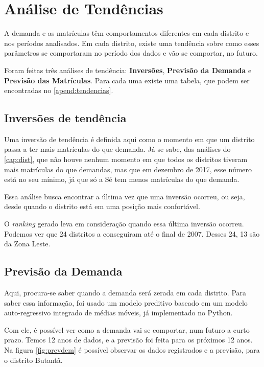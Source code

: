 \chapter{Análise de Tendências}
\label{cap:tendencias}

A demanda e as matrículas têm comportamentos diferentes em cada distrito e nos períodos analisados. Em cada distrito, existe uma tendência sobre como esses parâmetros se comportaram no período dos dados e vão se comportar, no futuro.

Foram feitas três análises de tendência: \textbf{Inversões}, \textbf{Previsão da Demanda} e \textbf{Previsão das Matrículas}. Para cada uma existe uma tabela, que podem ser encontradas no \autoref{apend:tendencias}.

\section{Inversões de tendência}

Uma inversão de tendência é definida aqui como o momento em que um distrito passa a ter mais matrículas do que demanda. Já se sabe, das análises do \autoref{cap:dist}, que não houve nenhum momento em que todos os distritos tiveram mais matrículas do que demandas, mas que em dezembro de 2017, esse número está no seu mínimo, já que só a Sé tem menos matrículas do que demanda.

Essa análise busca encontrar a última vez que uma inversão ocorreu, ou seja, desde quando o distrito está em uma posição mais confortável.

O \textit{ranking} gerado leva em consideração quando essa última inversão ocorreu. Podemos ver que 24 distritos a conseguiram até o final de 2007. Desses 24, 13 são da Zona Leste.

\section{Previsão da Demanda}

Aqui, procura-se saber quando a demanda será zerada em cada distrito. Para saber essa informação, foi usado um modelo preditivo baseado em um modelo auto-regressivo integrado de médias móveis, já implementado no Python.

Com ele, é possível ver como a demanda vai se comportar, num futuro a curto prazo. Temos 12 anos de dados, e a previsão foi feita para os próximos 12 anos. Na figura \autoref{fig:prevdem} é possível observar os dados registrados e a previsão, para o distrito Butantã.

